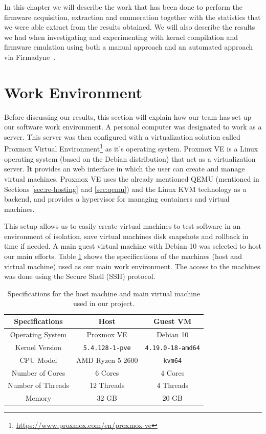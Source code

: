 In this chapter we will describe the work that has been done to perform the firmware acquisition, extraction and enumeration together with the statistics that we were able extract from the results obtained. We will also describe the results we had when investigating and experimenting with kernel compilation and firmware emulation using both a manual approach and an automated approach via Firmadyne~\cite{firmadyne}.

\section{Work Environment}

Before discussing our results, this section will explain how our team has set up our software work environment. A personal computer was designated to work as a server. This server was then configured with a virtualization solution called Proxmox Virtual Environment\footnote{\url{https://www.proxmox.com/en/proxmox-ve}} as it's operating system. Proxmox VE is a Linux operating system (based on the Debian distribution) that act as a virtualization server. It provides an web interface in which the user can create and manage virtual machines. Proxmox VE uses the already mentioned QEMU \cite{qemu} (mentioned in Sections \ref{sec:re-hosting} and \ref{sec:qemu}) and the Linux KVM technology as a backend, and provides a hypervisor for managing containers and virtual machines.

This setup allows us to easily create virtual machines to test software in an environment of isolation, save virtual machines disk snapshots and rollback in time if needed. A main guest virtual machine with Debian 10 was selected to host our main efforts. Table \ref{tab:vm-specs} shows the specifications of the machines (host and virtual machine) used as our main work environment. The access to the machines was done using the Secure Shell (SSH) protocol.

\begin{table}[H]
\centering
\caption{Specifications for the host machine and main virtual machine used in our project.}
\begin{tabular}{|c|c|c|}
\hline
\textbf{Specifications} & \textbf{Host} & \textbf{Guest VM} \\ \hline
Operating System        & Proxmox VE           & Debian 10             \\
Kernel Version          & {\tt5.4.128-1-pve}   & {\tt 4.19.0-18-amd64} \\
CPU Model               & AMD Ryzen 5 2600     & {\tt kvm64}           \\
Number of Cores         & 6 Cores              & 4 Cores               \\
Number of Threads       & 12 Threads           & 4 Threads             \\
Memory                  & 32 GB                & 20 GB                 \\ \hline
\end{tabular}
\label{tab:vm-specs}
\end{table}

